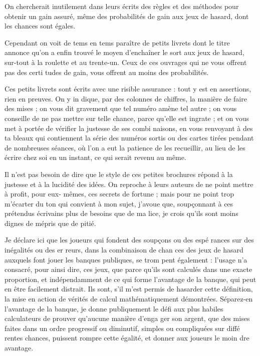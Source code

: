 On chercherait inutilement dans
leurs écrits des règles et des méthodes
pour obtenir un gain assuré, même
des probabilités de gain aux jeux de 
hasard, dont les chances sont égales.

Cependant on voit de tems en tems
paraître de petits livrets dont le titre
annonce qu'on a enfin trouvé le
moyen d'enchaîner le sort aux jeux
de hasard, sur-tout à la roulette et
au trente-un. Ceux de ces ouvrages
qui ne vous offrent pas des certi%
tudes de gain, vous offrent au moins
des probabilités.

Ces petits livrets sont écrits avec
une risible assurance : tout y est en
assertions, rien en preuves. On y in%
dique, par des colonnes de chiffres,
la manière de faire des mises ; on vous
dit gravement que tel numéro amène
tel autre ; on vous conseille de ne pas
mettre sur telle chance, parce qu'elle
est ingrate ; et on vous met à portée
de vérifier la justesse de ses combi%
naisons, en vous renvoyant à des ta%
bleaux qui contiennent la série des
numéros sortis ou des cartes tirées
pendant de nombreuses séances, où
l'on a eut la patience de les recueillir,
au lieu de les écrire chez soi en un
instant, ce qui serait revenu au même.

Il n'est pas besoin de dire que le
style de ces petites brochures répond
à la justesse et à la lucidité des idées.
On reproche à leurs auteurs de ne
point mettre à profit, pour eux-%
mêmes, ces secrets de fortune ; mais
pour ne point trop m'écarter du ton
qui convient à mon sujet, j'avoue
que, soupçonnant à ces prétendus
écrivains plus de besoins que de ma%
lice, je crois qu'ils sont moins dignes
de mépris que de pitié.

Je déclare ici que les joueurs qui
fondent des soupçons ou des espé%
rances sur des inégalités ou des er%
reurs, dans la combinaison de chan%
ces des jeux de hasard auxquels font
jouer les banques publiques, se trom%
pent également : l'usage n'a consacré,
pour ainsi dire, ces jeux, que parce
qu'ils sont calculés dans une exacte
proportion, et indépendamment de
ce qui forme l'avantage de la banque,
qui peut en être facilement distrait.
Ils sont, s'il m'est permis de hasarder
cette définition, la mise en action de
vérités de calcul mathématiquement
démontrées. Séparez-en l'avantage de
la banque, je donne publiquement le
défi aux plus habiles calculateurs de
prouver qu'aucune manière d'enga%
ger son argent, que des mises faites
dans un ordre progressif ou diminutif,
simples ou compliquées sur diffé%
rentes chances, puissent rompre cette
égalité, et donner aux joueurs le moin%
dre avantage.

